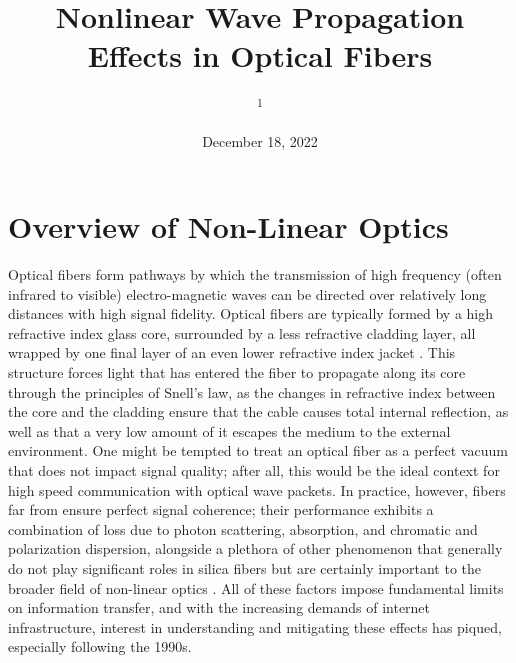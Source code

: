 \documentclass[10pt, a4paper, twocolumn]{article} %
\title{Nonlinear Wave Propagation Effects in Optical Fibers} %
\author{
	\authorstyle{Nathan Constantinides\textsuperscript{1}}%
	\newline\newline %
	\textsuperscript{1}\institution{University of Maryland, College Park}\\ %
}
\date{December 18, 2022} %
\begin{document}
\maketitle %

\thispagestyle{firstpage} %





\section{Overview of Non-Linear Optics}
Optical fibers form pathways by which the transmission of high frequency (often infrared to visible) electro-magnetic waves can be directed over relatively long distances with high signal fidelity. Optical fibers are typically formed by a high refractive index glass core, surrounded by a less refractive cladding layer, all wrapped by one final layer of an even lower refractive index jacket \cite{AgrawalChap1}. This structure forces light that has entered the fiber to propagate along its core through the principles of Snell's law, as the changes in refractive index between the core and the cladding ensure that the cable causes total internal reflection, as well as that a very low amount of it escapes the medium to the external environment. One might be tempted to treat an optical fiber as a perfect vacuum that does not impact signal quality; after all, this would be the ideal context for high speed communication with optical wave packets. In practice, however, fibers far from ensure perfect signal coherence; their performance exhibits a combination of loss due to photon scattering, absorption, and chromatic and polarization dispersion, alongside a plethora of other phenomenon that generally do not play significant roles in silica fibers but are certainly important to the broader field of non-linear optics \cite{AgrawalChap1}. All of these factors impose fundamental limits on information transfer, and with the increasing demands of internet infrastructure, interest in understanding and mitigating these effects has piqued, especially following the 1990s. 
\end{document}
